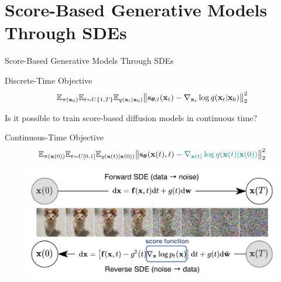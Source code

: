 \documentclass{beamer}
\begin{document}
\section{Score-Based Generative Models Through SDEs}
\begin{frame}{Score-Based Generative Models Through SDEs}
	\begin{block}{Discrete-Time Objective}
		\vspace{-0.3cm}
		\[
			\mathbb{E}_{\pi(\mathbf{x}_0)} \mathbb{E}_{t \sim U\{1, T\}} \mathbb{E}_{q(\mathbf{x}_t | \mathbf{x}_0)}\bigl\| \mathbf{s}_{\boldsymbol{\theta}, t}(\mathbf{x}_t) - \nabla_{\mathbf{x}_t} \log q(\mathbf{x}_t | \mathbf{x}_0) \bigr\|^2_2 
		\]
		\vspace{-0.5cm}
	\end{block}
	Is it possible to train score-based diffusion models in continuous time?
	\begin{block}{Continuous-Time Objective}
		\vspace{-0.7cm}
		\[
			\mathbb{E}_{\pi(\mathbf{x}(0))} \mathbb{E}_{t \sim U[0, 1]} \mathbb{E}_{q(\mathbf{x}(t) | \mathbf{x}(0))}\bigl\| \mathbf{s}_{\boldsymbol{\theta}}(\mathbf{x}(t), t) - {\color{teal}\nabla_{\mathbf{x}(t)} \log q(\mathbf{x}(t) | \mathbf{x}(0))} \bigr\|^2_2 
		\]
		\vspace{-0.7cm}
	\end{block}
	\vspace{-0.4cm}
	\begin{figure}
		\includegraphics[width=0.75\linewidth]{figs/sbgm}
	\end{figure}
\end{frame}
\end{document}
